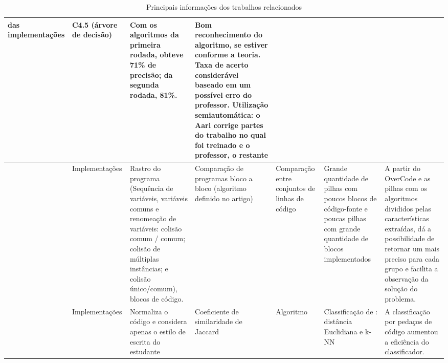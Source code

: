 \begin{landscape}
\begin{table}[h]
\begin{tabularx}{\linewidth}{ |X|X|X|X|X|X|X| }
					das implementações
					& C4.5 (árvore de decisão)
					& Com os algoritmos da primeira rodada, obteve 71\% de precisão; da
					segunda rodada, 81\%.
					& Bom reconhecimento do algoritmo, se estiver conforme a teoria. Taxa de
					acerto considerável baseado em um possível erro do professor. Utilização
					semiautomática: o Aari corrige partes do trabalho no qual foi treinado e
					o professor, o restante \\
					\hline %
					\citeonline{Glassman:2015}
					& Implementações
					& Rastro do programa (Sequência de variáveis, variáveis comuns e
					renomeação de variáveis: colisão comum / comum; colisão de múltiplas
					instâncias; e colisão único/comum), blocos de código.
					& Comparação de programas bloco a bloco (algoritmo definido no artigo)
					& Comparação entre conjuntos de linhas de código
					& Grande quantidade de pilhas com poucos blocos de código-fonte e poucas
					pilhas com grande quantidade de blocos implementados
					& A partir do OverCode e as pilhas com os algoritmos divididos pelas
					características extraídas, dá a possibilidade de retornar um
					\foreign{feedback} mais preciso para cada grupo e facilita a observação
					da solução do problema. \\
					\hline %
					\citeonline{Wei2015}
					& Implementações
					& Normaliza o código e considera apenas o estilo de escrita do estudante
					& Coeficiente de similaridade de Jaccard
					& Algoritmo \foreign{Winnowing}
					& Classificação de \foreign{workload}: distância Euclidiana e k-NN
					& A classificação por pedaços de código aumentou a eficiência do classificador. \\
					\hline
				\end{tabularx}
				\captionsetup{justification=centering}
				\caption{Principais informações dos trabalhos relacionados}
				\label{tab:caracPrinc}
			\end{table}
		\end{landscape}